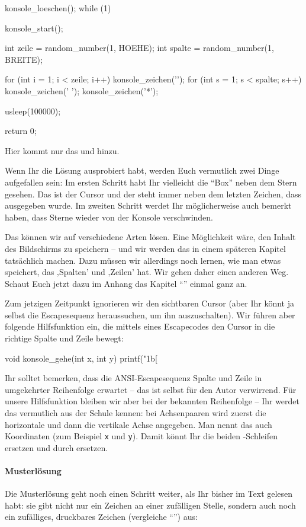 \begin{challenge}
\begin{solution}
\begin{code}
{    konsole_loeschen();
    while (1) {
        konsole_start();

        int zeile = random_number(1, HOEHE);
        int spalte = random_number(1, BREITE);

        for (int i = 1; i < zeile; i++) {
            konsole_zeichen('\n');
        }
        for (int s = 1; s < spalte; s++) {
            konsole_zeichen(' ');
        }
        konsole_zeichen('*');

        usleep(100000);
    }

    return 0;
}
\end{code}
    Hier kommt nur das  und  hinzu.
    \end{solution}
\end{challenge}

\noindent
Wenn Ihr die Lösung ausprobiert habt, werden Euch vermutlich zwei Dinge aufgefallen sein: Im ersten Schritt habt Ihr vielleicht die ``Box'' neben dem Stern gesehen. Das ist der Cursor und der steht immer neben dem letzten Zeichen, dass ausgegeben wurde. Im zweiten Schritt werdet Ihr möglicherweise auch bemerkt haben, dass Sterne wieder von der Konsole verschwinden. 

Das können wir auf verschiedene Arten lösen. Eine Möglichkeit wäre, den Inhalt des Bildschirms zu speichern -- und wir werden das in einem späteren Kapitel tatsächlich machen. Dazu müssen wir allerdings noch lernen, wie man etwas speichert, das ‚Spalten' und ‚Zeilen' hat. Wir gehen daher einen anderen Weg. Schaut Euch jetzt dazu im Anhang das Kapitel ``'' einmal ganz an.

Zum jetzigen Zeitpunkt ignorieren wir den sichtbaren Cursor (aber Ihr könnt ja selbst die Escapesequenz heraussuchen, um ihn auszuschalten). Wir führen aber folgende Hilfsfunktion ein, die mittels eines Escapecodes den Cursor in die richtige Spalte und Zeile bewegt:
\begin{code}[numbers=none]
void konsole_gehe(int x, int y) {
    printf("\x1b[%
}
\end{code}
Ihr solltet bemerken, dass die ANSI-Escapesequenz Spalte und Zeile in umgekehrter Reihenfolge erwartet -- das ist selbst für den Autor verwirrend. Für unsere Hilfsfunktion bleiben wir aber bei der bekannten Reihenfolge -- Ihr werdet das vermutlich aus der Schule kennen: bei Achsenpaaren wird zuerst die horizontale und dann die vertikale Achse angegeben. Man nennt das auch Koordinaten (zum Beispiel \texttt{x} und \texttt{y}). Damit könnt Ihr die beiden -Schleifen ersetzen und durch  ersetzen.

\newpage
\paragraph{Musterlösung}
Die Musterlösung geht noch einen Schritt weiter, als Ihr bisher im Text gelesen habt: sie gibt nicht nur ein Zeichen an einer zufälligen Stelle, sondern auch noch ein zufälliges, druckbares Zeichen (vergleiche ``'') aus:
